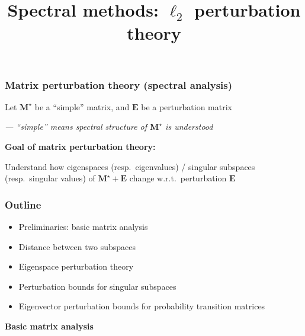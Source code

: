 \documentclass[compress,
mathserif,wide,%
]{beamer}
\title %
{Spectral methods: $\ell_2$ perturbation theory}
\begin{document}
\begin{frame}[plain]
  \titlepage

\end{frame}

\begin{frame}
	\frametitle{Matrix perturbation theory (spectral analysis)}
	Let $\bm{M}^{\star}$ be a ``simple'' matrix, and $\bm{E}$ be a perturbation matrix
	
	{\hfill \footnotesize \em --- ``simple'' means spectral structure of $\bm{M}^{\star}$ is understood} 
	
	\vfill
	{

\begin{varblock}[\textwidth]{}
{\bf Goal of matrix perturbation theory: } \\
\begin{center}
Understand how eigenspaces (resp.~eigenvalues) / singular subspaces (resp.~singular values) of $\bm{M}^{\star} + \bm{E}$ change w.r.t.~perturbation $\bm{E}$
\end{center}
\end{varblock}
}
\end{frame}


\begin{frame}
\frametitle{Outline}

\begin{itemize}
  \itemsep1em
  \item Preliminaries: basic matrix analysis
  \item Distance between two subspaces
  \item Eigenspace perturbation theory
  \item Perturbation bounds for singular subspaces
  \item Eigenvector perturbation bounds for probability transition matrices
\end{itemize}

\end{frame}



\begin{frame}[plain]

\vfill
\begin{center}
  {\Large\bf Basic matrix analysis}

\end{center}
\vfill

\end{frame}
\end{document}
